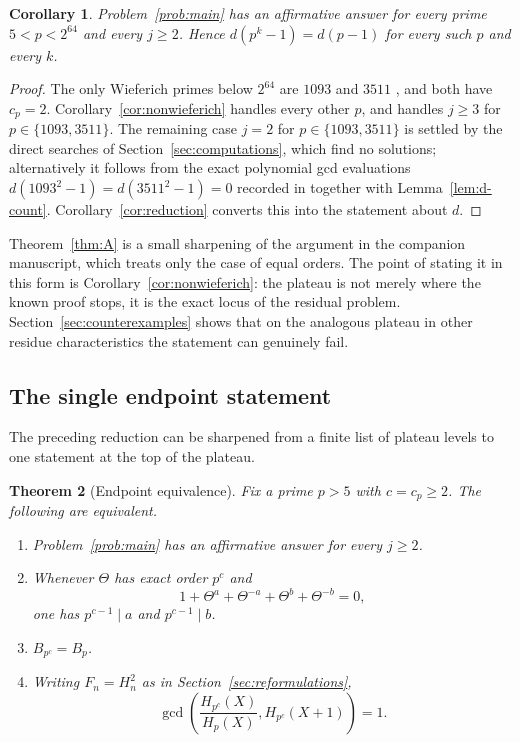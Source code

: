 \documentclass[a4paper]{article}
\newtheorem{theorem}{Theorem}[section]
\newtheorem{corollary}[theorem]{Corollary}
\begin{document}
\begin{corollary}\label{cor:2^64}
	Problem~\ref{prob:main} has an affirmative answer for every prime
	$5<p<2^{64}$ and every $j\geq2$.
	Hence $d(p^k-1)=d(p-1)$ for every such $p$ and every $k$.
\end{corollary}

\begin{proof}
	The only Wieferich primes below $2^{64}$ are $1093$ and $3511$
	\cite{CrandallSearch,KellerRichstein2005,DoraisKlyve2011,PrimeGridWieferich},
	and both have $c_p=2$.
	Corollary~\ref{cor:nonwieferich} handles every other $p$, and handles
	$j\geq3$ for $p\in\{1093,3511\}$.
	The remaining case $j=2$ for $p\in\{1093,3511\}$ is settled by the
	direct searches of Section~\ref{sec:computations}, which find no
	solutions; alternatively it follows from the exact polynomial gcd
	evaluations $d(1093^2-1)=d(3511^2-1)=0$ recorded
	in  together with
	Lemma~\ref{lem:d-count}.
	Corollary~\ref{cor:reduction} converts this into the statement about
	$d$.
\end{proof}

Theorem~\ref{thm:A} is a small sharpening of the argument in the companion
manuscript, which treats only the case of equal orders.
The point of stating it in this form is Corollary~\ref{cor:nonwieferich}:
the plateau is not merely where the known proof stops, it is the exact
locus of the residual problem.
Section~\ref{sec:counterexamples} shows that on the analogous plateau in
other residue characteristics the statement can genuinely fail.

\subsection{The single endpoint statement}

The preceding reduction can be sharpened from a finite list of plateau
levels to one statement at the top of the plateau.

\begin{theorem}[Endpoint equivalence]\label{thm:endpoint-equivalence}
	Fix a prime $p>5$ with $c=c_p\geq2$.  The following are equivalent.
	\begin{enumerate}
		\item Problem~\ref{prob:main} has an affirmative answer for every
		      $j\geq2$.
		\item Whenever $\Theta$ has exact order $p^c$ and
		      \[
			      1+\Theta^a+\Theta^{-a}+\Theta^b+\Theta^{-b}=0,
		      \]
		      one has $p^{c-1}\mid a$ and $p^{c-1}\mid b$.
		\item $B_{p^c}=B_p$.
		\item Writing $F_n=H_n^2$ as in Section~\ref{sec:reformulations},
		      \begin{equation}\label{eq:endpoint-gcd}
			      \gcd\!\left(
				      \frac{H_{p^c}(X)}{H_p(X)},
				      H_{p^c}(X+1)
			      \right)=1.
		      \end{equation}
	\end{enumerate}
\end{theorem}
\end{document}
